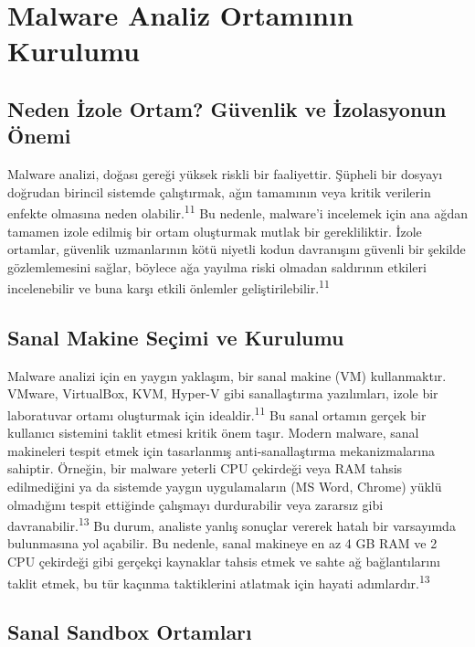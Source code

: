 \section{Malware Analiz Ortamının Kurulumu}

\subsection{Neden İzole Ortam? Güvenlik ve İzolasyonun Önemi}

Malware analizi, doğası gereği yüksek riskli bir faaliyettir. Şüpheli bir dosyayı doğrudan birincil sistemde çalıştırmak, ağın tamamının veya kritik verilerin enfekte olmasına neden olabilir.\textsuperscript{11} Bu nedenle, malware'i incelemek için ana ağdan tamamen izole edilmiş bir ortam oluşturmak mutlak bir gerekliliktir. İzole ortamlar, güvenlik uzmanlarının kötü niyetli kodun davranışını güvenli bir şekilde gözlemlemesini sağlar, böylece ağa yayılma riski olmadan saldırının etkileri incelenebilir ve buna karşı etkili önlemler geliştirilebilir.\textsuperscript{11}

\subsection{Sanal Makine Seçimi ve Kurulumu}

Malware analizi için en yaygın yaklaşım, bir sanal makine (VM) kullanmaktır. VMware, VirtualBox, KVM, Hyper-V gibi sanallaştırma yazılımları, izole bir laboratuvar ortamı oluşturmak için idealdir.\textsuperscript{11} Bu sanal ortamın gerçek bir kullanıcı sistemini taklit etmesi kritik önem taşır. Modern malware, sanal makineleri tespit etmek için tasarlanmış anti-sanallaştırma mekanizmalarına sahiptir. Örneğin, bir malware yeterli CPU çekirdeği veya RAM tahsis edilmediğini ya da sistemde yaygın uygulamaların (MS Word, Chrome) yüklü olmadığını tespit ettiğinde çalışmayı durdurabilir veya zararsız gibi davranabilir.\textsuperscript{13} Bu durum, analiste yanlış sonuçlar vererek hatalı bir varsayımda bulunmasına yol açabilir. Bu nedenle, sanal makineye en az 4 GB RAM ve 2 CPU çekirdeği gibi gerçekçi kaynaklar tahsis etmek ve sahte ağ bağlantılarını taklit etmek, bu tür kaçınma taktiklerini atlatmak için hayati adımlardır.\textsuperscript{13}

\subsection{Sanal Sandbox Ortamları}

